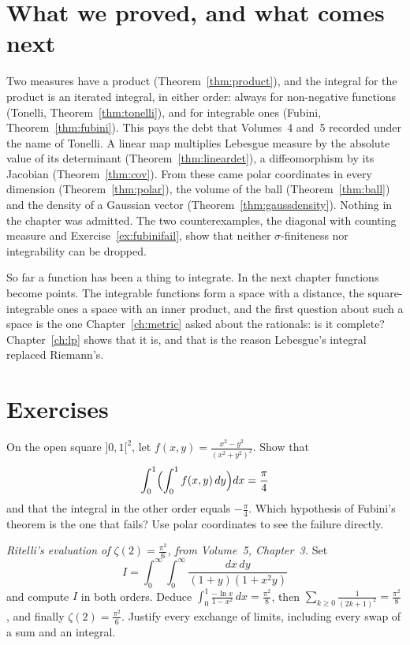\section{What we proved, and what comes next}

Two measures have a product (Theorem~\ref{thm:product}), and the integral for the product is an iterated integral, in either order: always for non-negative
functions (Tonelli, Theorem~\ref{thm:tonelli}), and for integrable ones (Fubini, Theorem~\ref{thm:fubini}). This pays the debt that Volumes~4 and~5 recorded under the name of Tonelli.
A linear map multiplies Lebesgue measure by the absolute value of its determinant (Theorem~\ref{thm:lineardet}), a diffeomorphism by its Jacobian
(Theorem~\ref{thm:cov}). From these came polar coordinates in every dimension (Theorem~\ref{thm:polar}), the volume of the ball (Theorem~\ref{thm:ball}) and the density of
a Gaussian vector (Theorem~\ref{thm:gaussdensity}). Nothing in the chapter was admitted. The two counterexamples, the diagonal with counting measure and
Exercise~\ref{ex:fubinifail}, show that neither $\sigma$-finiteness nor integrability can be dropped.

So far a function has been a thing to integrate. In the next chapter functions become points. The integrable functions form a space with a
distance, the square-integrable ones a space with an inner product, and the first question about such a space is the one Chapter~\ref{ch:metric} asked
about the rationals: is it complete? Chapter~\ref{ch:lp} shows that it is, and that is the reason Lebesgue's integral replaced Riemann's.

\section{Exercises}

\begin{exercise}[$\star$]\label{ex:fubinifail}
On the open square $]0,1[^2$, let $f(x,y)=\frac{x^2-y^2}{(x^2+y^2)^2}$. Show that
\[
\int_0^1\Bigl(\int_0^1 f(x,y)\,dy\Bigr)dx=\frac\pi4
\]
and that the integral in the other order equals $-\frac\pi4$. Which hypothesis of Fubini's theorem is the one that fails? Use polar coordinates to see the failure directly.
\end{exercise}

\begin{exercise}[$\star\star$]\label{ex:basel}
\emph{Ritelli's evaluation of $\zeta(2)=\frac{\pi^2}6$, from Volume~5, Chapter~3.} Set
\[
I=\int_0^\infty\!\int_0^\infty\frac{dx\,dy}{(1+y)(1+x^2y)}
\]
and compute $I$ in both orders. Deduce $\int_0^1\frac{-\ln x}{1-x^2}\,dx=\frac{\pi^2}8$, then $\sum_{k\ge 0}\frac1{(2k+1)^2}=\frac{\pi^2}8$, and finally $\zeta(2)=\frac{\pi^2}6$. Justify every exchange of limits, including every swap of a sum and an integral.
\end{exercise}


